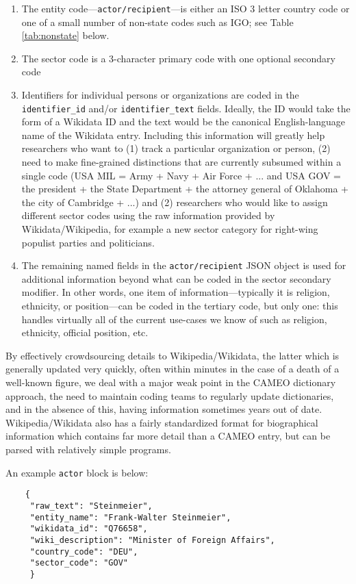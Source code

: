 \documentclass[11pt]{report}
\newcommand{\txt}[1]{\texttt{#1}}
\begin{document}
\begin{enumerate}
\item The entity code---\texttt{actor/recipient}---is either an ISO 3 letter country code or one of a small number of non-state codes such as IGO; see Table \ref{tab:nonstate} below.
\item The sector code is a 3-character primary code with one optional secondary code
\item Identifiers for individual persons or organizations are coded in the \texttt{identifier\_id} and/or \texttt{identifier\_text} fields. Ideally, the ID would take the form of a Wikidata ID and the text would be the canonical English-language name of the Wikidata entry. Including this information will greatly help researchers who want to (1) track a particular organization or person, (2) need to make fine-grained distinctions that are currently subsumed within a single code (USA MIL = Army + Navy + Air Force + ... and USA GOV = the president + the State Department + the attorney general of Oklahoma + the city of Cambridge + ...) and (2) researchers who would like to assign different sector codes using the raw information provided by Wikidata/Wikipedia, for example a new sector category for right-wing populist parties and politicians.
\item The remaining named fields in the \txt{actor/recipient} JSON object is used for additional information beyond what can be coded in the sector secondary modifier. In other words, one item of information---typically it is religion, ethnicity, or position---can be coded in the tertiary code, but only one: this handles virtually all of the current use-cases we know of such as religion, ethnicity, official position, etc.
\end{enumerate}

By effectively crowdsourcing details to Wikipedia/Wikidata, the latter which is generally updated very quickly, often within minutes in the case of a death of a well-known figure, we deal with a major weak point in the CAMEO dictionary approach,  the need to maintain coding teams to regularly update dictionaries, and in the absence of this, having information sometimes years out of date. Wikipedia/Wikidata also has a fairly standardized format for biographical information which contains far more detail than a CAMEO entry, but can be parsed with relatively simple programs.

An example \txt{actor} block is below:

\begin{verbatim}
	{
	 "raw_text": "Steinmeier",
	 "entity_name": "Frank-Walter Steinmeier",
	 "wikidata_id": "Q76658",
	 "wiki_description": "Minister of Foreign Affairs",
	 "country_code": "DEU",
	 "sector_code": "GOV"
	 }
\end{verbatim}
\end{document}
